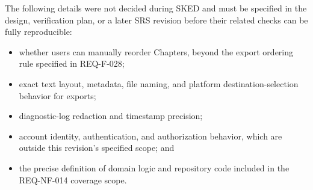 \documentclass[11pt,a4paper]{article}
\begin{document}
The following details were not decided during SKED and must be specified in the design, verification plan, or a later SRS revision before their related checks can be fully reproducible:
\begin{itemize}
  \item whether users can manually reorder Chapters, beyond the export ordering rule specified in REQ-F-028;
  \item exact text layout, metadata, file naming, and platform destination-selection behavior for exports;
  \item diagnostic-log redaction and timestamp precision;
  \item account identity, authentication, and authorization behavior, which are outside this revision's specified scope; and
  \item the precise definition of domain logic and repository code included in the REQ-NF-014 coverage scope.
\end{itemize}
\end{document}
